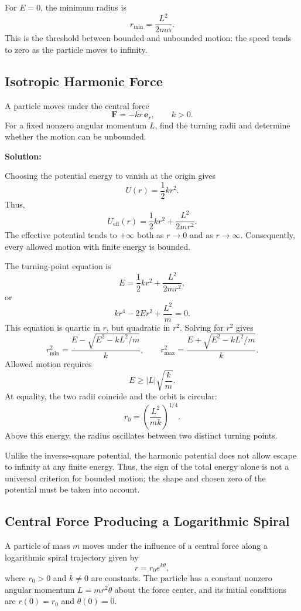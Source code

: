 \documentclass[12pt]{article}
\begin{document}
For $E=0$, the minimum radius is
\[
    r_{\min}=\frac{L^2}{2m\alpha}.
\]
This is the threshold between bounded and unbounded motion:
the speed tends to zero as the particle moves to infinity.

\subsection{Isotropic Harmonic Force}

A particle moves under the central force
\[
    \mathbf{F}=-kr\,\mathbf{e}_r,
    \qquad k>0.
\]
For a fixed nonzero angular momentum $L$, find the turning
radii and determine whether the motion can be unbounded.

\textbf{Solution:}

Choosing the potential energy to vanish at the origin gives
\[
    U(r)=\frac{1}{2}kr^2.
\]
Thus,
\[
    U_{\mathrm{eff}}(r)
    =\frac{1}{2}kr^2+\frac{L^2}{2mr^2}.
\]
The effective potential tends to $+\infty$ both as $r\to0$
and as $r\to\infty$. Consequently, every allowed motion
with finite energy is bounded.

The turning-point equation is
\[
    E=\frac{1}{2}kr^2+\frac{L^2}{2mr^2},
\]
or
\[
    kr^4-2Er^2+\frac{L^2}{m}=0.
\]
This equation is quartic in $r$, but quadratic in $r^2$.
Solving for $r^2$ gives
\[
    r_{\min}^2
    =\frac{E-\sqrt{E^2-kL^2/m}}{k},
    \qquad
    r_{\max}^2
    =\frac{E+\sqrt{E^2-kL^2/m}}{k}.
\]
Allowed motion requires
\[
    E\geq |L|\sqrt{\frac{k}{m}}.
\]
At equality, the two radii coincide and the orbit is circular:
\[
    r_0=\left(\frac{L^2}{mk}\right)^{1/4}.
\]
Above this energy, the radius oscillates between two distinct turning points.

Unlike the inverse-square potential, the harmonic potential does not allow escape to infinity at any finite energy. Thus, the sign of the total energy alone is not a universal criterion for bounded motion; the shape and chosen zero of the potential must be taken into account.






\subsection{Central Force Producing a Logarithmic Spiral}

A particle of mass $m$ moves under the influence of a central force
along a logarithmic spiral trajectory given by
\[
r=r_0e^{k\theta},
\]
where $r_0>0$ and $k\neq 0$ are constants. The particle has a
constant nonzero angular momentum $L=mr^2\dot{\theta}$ about the
force center, and its initial conditions are $r(0)=r_0$ and
$\theta(0)=0$.
\end{document}
